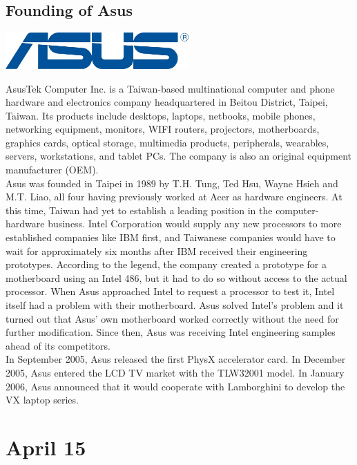 \documentclass[11pt]{report}
\begin{document}
\subsection{Founding of Asus}
\vspace{2mm}\begin{center}\includegraphics[width=7cm]{./img/asusLogo.jpg}\end{center}
AsusTek Computer Inc. is a Taiwan-based multinational computer and phone hardware and electronics company headquartered in Beitou District, Taipei, Taiwan. Its products include desktops, laptops, netbooks, mobile phones, networking equipment, monitors, WIFI routers, projectors, motherboards, graphics cards, optical storage, multimedia products, peripherals, wearables, servers, workstations, and tablet PCs. The company is also an original equipment manufacturer (OEM).\\
\indent Asus was founded in Taipei in 1989 by T.H. Tung, Ted Hsu, Wayne Hsieh and M.T. Liao, all four having previously worked at Acer as hardware engineers. At this time, Taiwan had yet to establish a leading position in the computer-hardware business. Intel Corporation would supply any new processors to more established companies like IBM first, and Taiwanese companies would have to wait for approximately six months after IBM received their engineering prototypes. According to the legend, the company created a prototype for a motherboard using an Intel 486, but it had to do so without access to the actual processor. When Asus approached Intel to request a processor to test it, Intel itself had a problem with their motherboard. Asus solved Intel's problem and it turned out that Asus' own motherboard worked correctly without the need for further modification. Since then, Asus was receiving Intel engineering samples ahead of its competitors.\\
\indent In September 2005, Asus released the first PhysX accelerator card. In December 2005, Asus entered the LCD TV market with the TLW32001 model. In January 2006, Asus announced that it would cooperate with Lamborghini to develop the VX laptop series.
\section{April 15}
\end{document}
